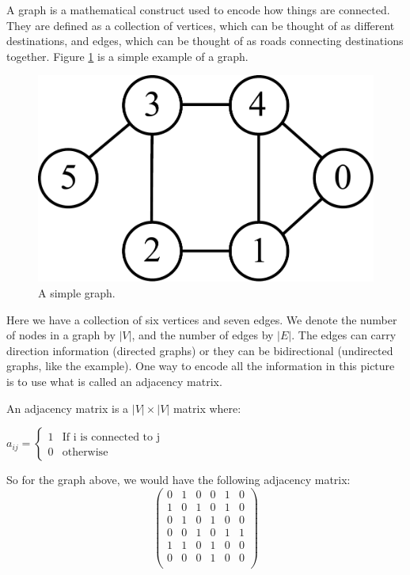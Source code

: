 

A graph is a mathematical construct used to encode how things are connected.
They are defined as a collection of vertices, which can be thought of as different destinations, and edges, which can be thought of as roads connecting destinations together.
Figure \ref{segmentation:graph} is a simple example of a graph.

\begin{figure}
\includegraphics[scale=0.4]{graphExample}
\caption{A simple graph.}
\label{segmentation:graph}
\end{figure}

Here we have a collection of six vertices and seven edges.
We denote the number of nodes in a graph by $|V|$, and the number of edges by $|E|$.
The edges can carry direction information (directed graphs) or they can be bidirectional (undirected graphs, like the example).
One way to encode all the information in this picture is to use what is called an adjacency matrix.

\begin{definition} An adjacency matrix is a $|V| \times |V|$ matrix where:
\begin{center}
	$a_{ij} = \begin{cases} 1 & \mbox{If i is connected to j} \\ 0 & \mbox{otherwise} \end{cases}$
\end{center}

\end{definition}

So for the graph above, we would have the following adjacency matrix:
\[
\begin{pmatrix}
0 & 1 & 0 & 0 & 1 & 0 \\
1 & 0 & 1 & 0 & 1 & 0 \\
0 & 1 & 0 & 1 & 0 & 0 \\
0 & 0 & 1 & 0 & 1 & 1 \\
1 & 1 & 0 & 1 & 0 & 0 \\
0 & 0 & 0 & 1 & 0 & 0 \\
\end{pmatrix}
\]

